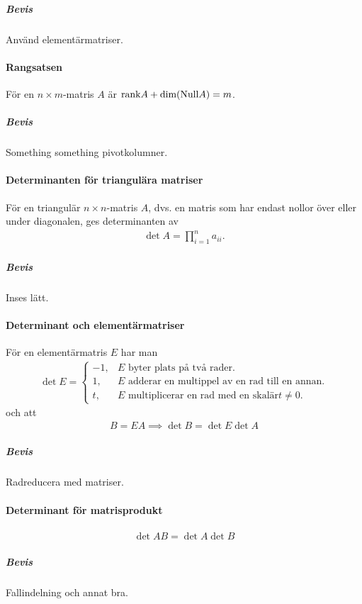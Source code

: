 \subparagraph{Bevis}
Använd elementärmatriser.

\paragraph{Rangsatsen}
För en $n\times m$-matris $A$ är $\text{rank} A + \text{dim}(\text{Null} A) = m$.

\subparagraph{Bevis}
Something something pivotkolumner.

\paragraph{Determinanten för triangulära matriser}
För en triangulär $n\times n$-matris $A$, dvs. en matris som har endast nollor över eller under diagonalen, ges determinanten av
\begin{align*}
	\det{A} = \prod\limits_{i = 1}^{n} a_{ii}.
\end{align*}

\subparagraph{Bevis}
Inses lätt.

\paragraph{Determinant och elementärmatriser}
För en elementärmatris $E$ har man
\begin{align*}
	\det{E} =
	\begin{cases}
		-1, &E\text{ byter plats på två rader.} \\
		1,  &E\text{ adderar en multippel av en rad till en annan.} \\
		t,  &E\text{ multiplicerar en rad med en skalär} t\neq 0.
	\end{cases}
\end{align*}
och att
\begin{align*}
	B = EA \implies \det{B} = \det{E}\det{A}
\end{align*}

\subparagraph{Bevis}
Radreducera med matriser.

\paragraph{Determinant för matrisprodukt}
\begin{align*}
	\det{AB} = \det{A}\det{B}
\end{align*}

\subparagraph{Bevis}
Fallindelning och annat bra.